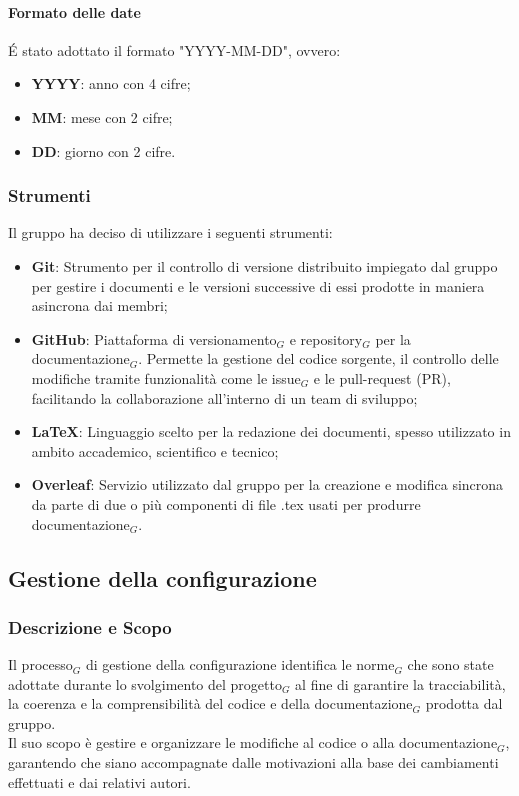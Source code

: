 \documentclass[10pt]{article}
\begin{document}
\begin{justify}
        \paragraph{Formato delle date}
        \'E stato adottato il formato "YYYY-MM-DD", ovvero:
        \begin{itemize}
            \item \textbf{YYYY}: anno con 4 cifre;
            \item \textbf{MM}: mese con 2 cifre;
            \item \textbf{DD}: giorno con 2 cifre.
        \end{itemize}

    \subsubsection{Strumenti}
    Il gruppo ha deciso di utilizzare i seguenti strumenti:
    \begin{itemize}
        \item \textbf{Git}: Strumento per il controllo di versione distribuito impiegato dal gruppo per gestire i documenti e le versioni successive di essi prodotte in maniera asincrona dai membri;
        \item \textbf{GitHub}: Piattaforma di versionamento$_G$ e repository$_G$ per la documentazione$_G$. Permette la gestione del codice sorgente, il controllo delle modifiche tramite funzionalità come le issue$_G$ e le pull-request (PR), facilitando la collaborazione all’interno di un team di sviluppo;
        \item \textbf{\LaTeX}: Linguaggio scelto per la redazione dei documenti, spesso utilizzato in ambito accademico, scientifico e tecnico;
        \item \textbf{Overleaf}: Servizio utilizzato dal gruppo per la creazione e modifica sincrona da parte di due o più componenti di file .tex usati per produrre documentazione$_G$.
    \end{itemize}

    \subsection{Gestione della configurazione}
    \label{gestione-configurazione}
    \subsubsection{Descrizione e Scopo}
    Il processo$_G$ di gestione della configurazione identifica le norme$_G$ che sono state adottate durante lo svolgimento del progetto$_G$ al fine di garantire la tracciabilità, la coerenza e la comprensibilità del codice e della documentazione$_G$ prodotta dal gruppo.\\
    Il suo scopo è gestire e organizzare le modifiche al codice o alla documentazione$_G$, garantendo che siano accompagnate dalle motivazioni alla base dei cambiamenti effettuati e dai relativi autori.


\end{justify}
\end{document}
